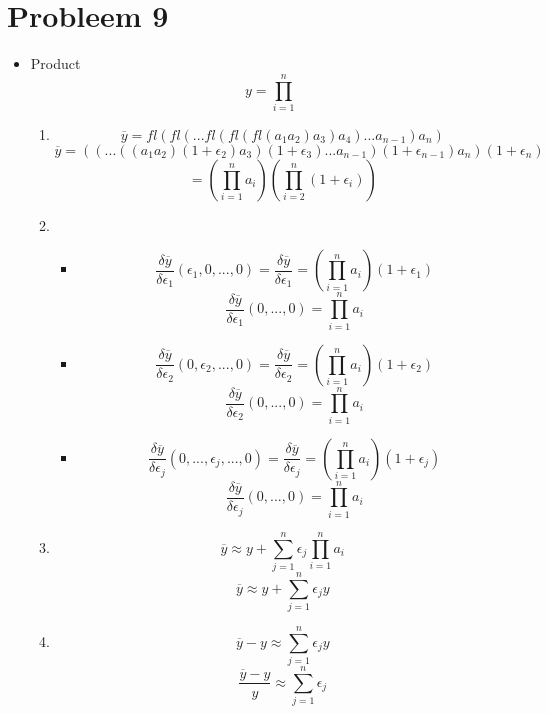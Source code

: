 \documentclass[12pt,a4paper]{article}
\begin{document}
\section{Probleem 9}
\begin{itemize}
\item Product\\
\[
y = \prod_{i=1}^{n}
\]
\begin{enumerate}
\item
\[
\overline{y} = fl(fl(...fl(fl(fl(a_1 a_2) a_3) a_4)... a_{n-1}) a_{n})
\]
\[
\overline{y} = ((...((a_1 a_2)(1+\epsilon_2) a_3)(1+\epsilon_3)...a_{n-1})(1+\epsilon_{n-1}) a_n)(1+\epsilon_n)
\]
\[
= \left(\prod_{i=1}^{n} a_{i} \right) \left( \prod_{i=2}^n(1+\epsilon_i) \right)
\]
\item
\begin{itemize}
\item
\[
\frac{\delta\overline{y}}{\delta\epsilon_1}(\epsilon_1,0,...,0)
= \frac{\delta\overline{y}}{\delta\epsilon_1}
= \left(\prod_{i=1}^{n} a_{i} \right) (1+\epsilon_1)
\]
\[
\frac{\delta\overline{y}}{\delta\epsilon_1}(0,...,0)
= \prod_{i=1}^{n} a_{i}
\]
\item
\[
\frac{\delta\overline{y}}{\delta\epsilon_2}(0,\epsilon_2,...,0)
= \frac{\delta\overline{y}}{\delta\epsilon_2}
= \left(\prod_{i=1}^{n} a_{i} \right) (1+\epsilon_2)
\]
\[
\frac{\delta\overline{y}}{\delta\epsilon_2}(0,...,0)
= \prod_{i=1}^{n} a_{i}
\]
\item
\[
\frac{\delta\overline{y}}{\delta\epsilon_j}(0,...,\epsilon_j,...,0)
= \frac{\delta\overline{y}}{\delta\epsilon_j}
= \left(\prod_{i=1}^{n} a_{i} \right) (1+\epsilon_j)
\]
\[
\frac{\delta\overline{y}}{\delta\epsilon_j}(0,...,0)
= \prod_{i=1}^{n} a_{i}
\]
\end{itemize}

\item
\[
\overline{y} \approx y
+ \sum_{j=1}^{n} \epsilon_j \prod_{i=1}^{n} a_{i}
\]
\[
\overline{y} \approx y
+ \sum_{j=1}^{n} \epsilon_j y
\]

\item
\[
\overline{y} - y
\approx
\sum_{j=1}^{n} \epsilon_j y
\]
\[
\frac{\overline{y} - y}{y}
\approx
\sum_{j=1}^{n} \epsilon_j
\]

\end{enumerate}


\end{itemize}
\end{document}

